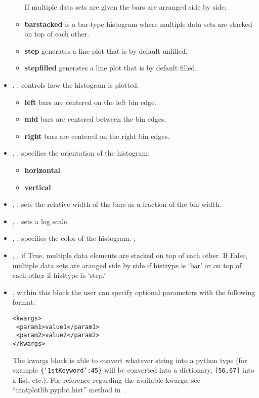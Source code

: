 \begin{itemize}
\begin{itemize}
    If multiple data sets are given the bars are arranged side by side.
    \item \textbf{barstacked} is a bar-type histogram where multiple data sets
    are stacked on top of each other.
    \item \textbf{step} generates a line plot that is by default unfilled.
    \item \textbf{stepfilled} generates a line plot that is by default filled.
  \end{itemize}
  \item {}, , controls how the
  histogram is plotted.
  \begin{itemize}
    \item \textbf{left} bars are centered on the left bin edge.
    \item \textbf{mid} bars are centered between the bin edges.
    \item \textbf{right} bars are centered on the right bin edges.
  \end{itemize}
  \item {}, , specifies the 
  orientation of the histogram:
  \begin{itemize}
    \item \textbf{horizontal}
    \item \textbf{vertical}
  \end{itemize}
  \item {}, , sets the relative
  width of the bars as a fraction of the bin width.
  \item {}, , sets a log scale.
  \item {}, , specifies the color
  of the histogram.
  ;
  \item {}, , if True, multiple
  data elements are stacked on top of each other. If False, multiple data sets
  are aranged side by side if histtype is `bar' or on top of each other if
  histtype is `step.'
  \item {}, within this block the user can specify optional
  parameters with the following format:

\begin{lstlisting}[style=XML]
<kwargs>
 <param1>value1</param1>
 <param2>value2</param2>
</kwargs>
\end{lstlisting}

    The kwargs block is able to convert whatever string into a python type (for
    example \texttt{\{`1stKeyword':45\}} will
    be converted into a dictionary, 
    \texttt{[56,67]} into a list, etc.).
  For reference regarding the available kwargs, see ``matplotlib.pyplot.hist''
  method in~\cite{MatPlotLib}.
    \end{itemize}

